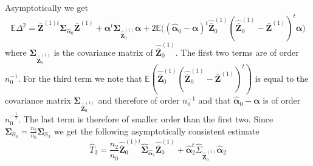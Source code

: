 \documentclass[a4paper,12pt,leqno, titlepage]{article}
\newcommand{\EX}{\mathbb{E}}
\begin{document}
\begin{appendix}
Asymptotically we get
\begin{equation*}
\EX \Delta^2=\bar{\pmb{Z}} ^{(1)t}\pmb{\Sigma}_{\hat{\pmb{\alpha}}_{0}}\bar{\pmb{Z}}^{(1)}+
\pmb{\alpha}^t\pmb{\Sigma}_{\hat{\bar{\pmb{Z}}}^{(1)}_{0}}\pmb{\alpha}+
2\EX\Big((\hat{\pmb{\alpha}}_{0}-\pmb{\alpha})^t\hat{\bar{\pmb{Z}}}^{(1)}_{0}(\hat{\bar{\pmb{Z}}}^{(1)}_{0}
-\bar{\pmb{Z}}^{(1)})^t\pmb{\alpha}\Big)
\end{equation*}
\noindent where $\pmb{\Sigma}_{\hat{\bar{\pmb{Z}}}^{(1)}_{0}}$ is the covariance matrix of
$\hat{\bar{\pmb{Z}}}^{(1)}_{0}$. The first two terms are of order $n_0^{-1}$. For the third term we note that
$\EX (\hat{\bar{\pmb{Z}}}^{(1)}_{0}(\hat{\bar{\pmb{Z}}}^{(1)}_{0}-\bar{\pmb{Z}}^{(1)})^t)$ is equal to the covariance matrix $\pmb{\Sigma}_{\hat{\bar{\pmb{Z}}}^{(1)}_{0}}$ and therefore of order $n_0^{-1}$ and that
$\hat{\pmb{\alpha}}_{0}-\pmb{\alpha}$ is of order $n_0^{-\frac{1}{2}}$. The last term is therefore of smaller order than the first two. Since $\pmb{\Sigma}_{\hat{\alpha}_0}=\frac{n_2}{n_0}\pmb{\Sigma}_{\hat{\alpha}_2}$ we get the following asymptotically consistent estimate
\begin{equation}\label{appendixhatt3}
\hat{T}_3 =
\frac{n_2}{n_0}\hat{\bar{\pmb{Z}}}^{(1)t}_{0}\hat{\pmb{\Sigma}}_{\hat{\pmb{\alpha}}_{2}}\hat{\bar{\pmb{Z}}}^{(1)}_{0}
+ \hat{\pmb{\alpha}}_{2}^t\hat{\Sigma}_{\hat{\bar{\pmb{Z}}}^{(1)}_{0}}\hat{\pmb{\alpha}}_{2}
\end{equation}



\end{appendix}
\end{document}
